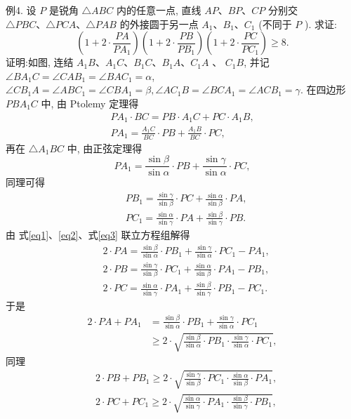 例4. 设 $P$ 是锐角 $\triangle A B C$ 内的任意一点, 直线 $A P 、 B P 、 C P$ 分别交 $\triangle P B C 、 \triangle P C A 、 \triangle P A B$ 的外接圆于另一点 $A_1 、 B_1 、 C_1$ (不同于 $P$ ). 求证:
$$
\left(1+2 \cdot \frac{P A}{P A_1}\right)\left(1+2 \cdot \frac{P B}{P B_1}\right)\left(1+2 \cdot \frac{P C}{P C_1}\right) \geqslant 8 .
$$
证明:如图, 连结 $A_1 B 、 A_1 C 、 B_1 C 、 B_1 A 、 C_1 A$ 、 $C_1 B$, 并记 $\angle B A_1 C=\angle C A B_1=\angle B A C_1=\alpha$, $\angle C B_1 A=\angle A B C_1=\angle C B A_1=\beta, \angle A C_1 B= \angle B C A_1=\angle A C B_1=\gamma$.
在四边形 $P B A_1 C$ 中, 由 Ptolemy 定理得
$$
\begin{gathered}
P A_1 \cdot B C=P B \cdot A_1 C+P C \cdot A_1 B, \\
P A_1=\frac{A_1 C}{B C} \cdot P B+\frac{A_1 B}{B C} \cdot P C,
\end{gathered}
$$
再在 $\triangle A_1 B C$ 中, 由正弦定理得
$$
P A_1=\frac{\sin \beta}{\sin \alpha} \cdot P B+\frac{\sin \gamma}{\sin \alpha} \cdot P C, \label{eq1}
$$
同理可得
$$
\begin{aligned}
& P B_1=\frac{\sin \gamma}{\sin \beta} \cdot P C+\frac{\sin \alpha}{\sin \beta} \cdot P A, \label{eq2} \\
& P C_1=\frac{\sin \alpha}{\sin \gamma} \cdot P A+\frac{\sin \beta}{\sin \gamma} \cdot P B . \label{eq3}
\end{aligned}
$$
由 式\ref{eq1}、\ref{eq2}、式\ref{eq3} 联立方程组解得
$$
\begin{aligned}
& 2 \cdot P A=\frac{\sin \beta}{\sin \alpha} \cdot P B_1+\frac{\sin \gamma}{\sin \alpha} \cdot P C_1-P A_1, \\
& 2 \cdot P B=\frac{\sin \gamma}{\sin \beta} \cdot P C_1+\frac{\sin \alpha}{\sin \beta} \cdot P A_1-P B_1, \\
& 2 \cdot P C=\frac{\sin \alpha}{\sin \gamma} \cdot P A_1+\frac{\sin \beta}{\sin \gamma} \cdot P B_1-P C_1 .
\end{aligned}
$$
于是
$$
\begin{aligned}
2 \cdot P A+P A_1 & =\frac{\sin \beta}{\sin \alpha} \cdot P B_1+\frac{\sin \gamma}{\sin \alpha} \cdot P C_1 \\
& \geqslant 2 \cdot \sqrt{\frac{\sin \beta}{\sin \alpha} \cdot P B_1 \cdot \frac{\sin \gamma}{\sin \alpha} \cdot P C_1},
\end{aligned}
$$
同理
$$
\begin{aligned}
& 2 \cdot P B+P B_1 \geqslant 2 \cdot \sqrt{\frac{\sin \gamma}{\sin \beta} \cdot P C_1 \cdot \frac{\sin \alpha}{\sin \beta} \cdot P A_1}, \\
& 2 \cdot P C+P C_1 \geqslant 2 \cdot \sqrt{\frac{\sin \alpha}{\sin \gamma} \cdot P A_1 \cdot \frac{\sin \beta}{\sin \gamma} \cdot P B_1},
\end{aligned}
$$
